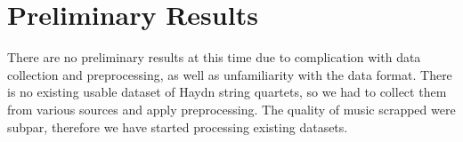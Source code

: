 \documentclass[10pt,twocolumn,letterpaper]{article}
\begin{document}
  \section{Preliminary Results}
  There are no preliminary results at this time due to complication with data collection and preprocessing, as well as unfamiliarity with the data format. There is no existing usable dataset of Haydn string quartets, so we had to collect them from various sources and apply preprocessing. The quality of music scrapped were subpar, therefore we have started processing existing datasets.
\end{document}
